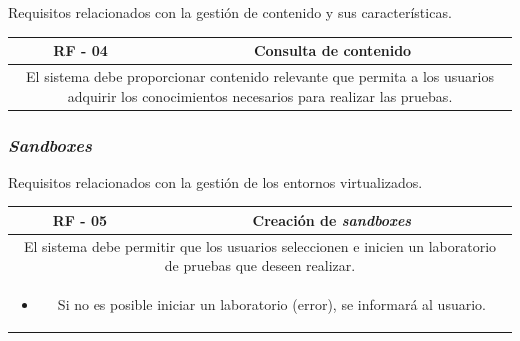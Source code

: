                 Requisitos relacionados con la gestión de contenido y sus características.
                
                \begin{table}[!htbp]
                    \centering
                    \begin{tabular}{|c|c|}
                        \hline
                        \textbf{RF - 04} & \textbf{Consulta de contenido} \\
                        \hline
                        \multicolumn{2}{|p{15cm}|}{
                            El sistema debe proporcionar contenido relevante que permita a los usuarios adquirir los conocimientos necesarios para realizar las pruebas.
                        } \\
                        \hline
                    \end{tabular}
                    \label{tab:RF4}
                \end{table}
                
                \newpage
            
            
            \subsubsection{\textit{Sandboxes}}
            
                Requisitos relacionados con la gestión de los entornos virtualizados.
                
                \begin{table}[!htbp]
                    \centering
                    \begin{tabular}{|c|c|}
                        \hline
                        \textbf{RF - 05} & \textbf{Creación de \textit{sandboxes}} \\
                        \hline
                        \multicolumn{2}{|p{15cm}|}{
                            El sistema debe permitir que los usuarios seleccionen e inicien un laboratorio de pruebas que deseen realizar.
                        } \\
                        \hline
                        \multicolumn{2}{|p{15cm}|}{
                            \begin{itemize}
                                \item Si no es posible iniciar un laboratorio (error), se informará al usuario.
                            \end{itemize}
                            } \\
                        \hline
                    \end{tabular}
                    \label{tab:RF5}
                \end{table}
                
